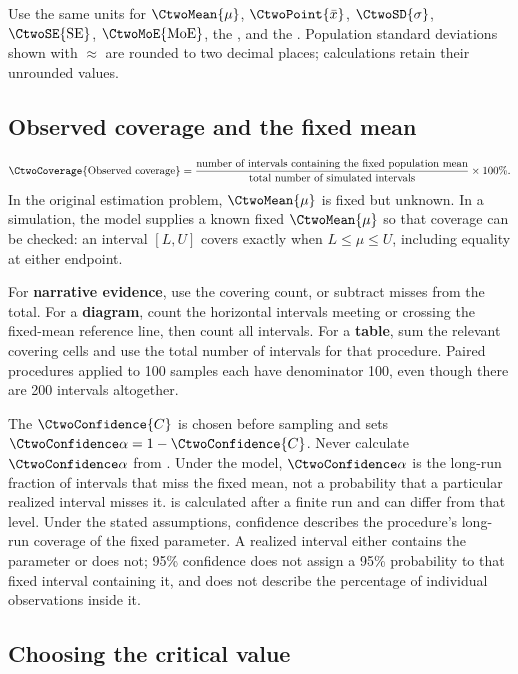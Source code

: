 Use the same units for $\CtwoMean{\mu}$, $\CtwoPoint{\bar{x}}$, $\CtwoSD{\sigma}$, $\CtwoSE{\mathrm{SE}}$, $\CtwoMoE{\mathrm{MoE}}$, the , and the . Population standard deviations shown with $\approx$ are rounded to two decimal places; calculations retain their unrounded values.

\subsection{Observed coverage and the fixed mean}
\[
\CtwoCoverage{\text{Observed coverage}}=
\frac{\text{number of intervals containing the fixed population mean}}
{\text{total number of simulated intervals}}\times100\%.
\]
In the original estimation problem, $\CtwoMean{\mu}$ is fixed but unknown. In a simulation, the model supplies a known fixed $\CtwoMean{\mu}$ so that coverage can be checked: an interval $[L,U]$ covers exactly when $L\leq\mu\leq U$, including equality at either endpoint.

For \textbf{narrative evidence}, use the covering count, or subtract misses from the total. For a \textbf{diagram}, count the horizontal intervals meeting or crossing the fixed-mean reference line, then count all intervals. For a \textbf{table}, sum the relevant covering cells and use the total number of intervals for that procedure. Paired procedures applied to 100 samples each have denominator 100, even though there are 200 intervals altogether.

The  $\CtwoConfidence{C}$ is chosen before sampling and sets $\CtwoSignificance{\alpha}=1-\CtwoConfidence{C}$. Never calculate $\CtwoSignificance{\alpha}$ from . Under the model, $\CtwoSignificance{\alpha}$ is the long-run fraction of intervals that miss the fixed mean, not a probability that a particular realized interval misses it.  is calculated after a finite run and can differ from that level. Under the stated assumptions, confidence describes the procedure's long-run coverage of the fixed parameter. A realized interval either contains the parameter or does not; 95\% confidence does not assign a 95\% probability to that fixed interval containing it, and does not describe the percentage of individual observations inside it.

\clearpage
\subsection{Choosing the critical value}

